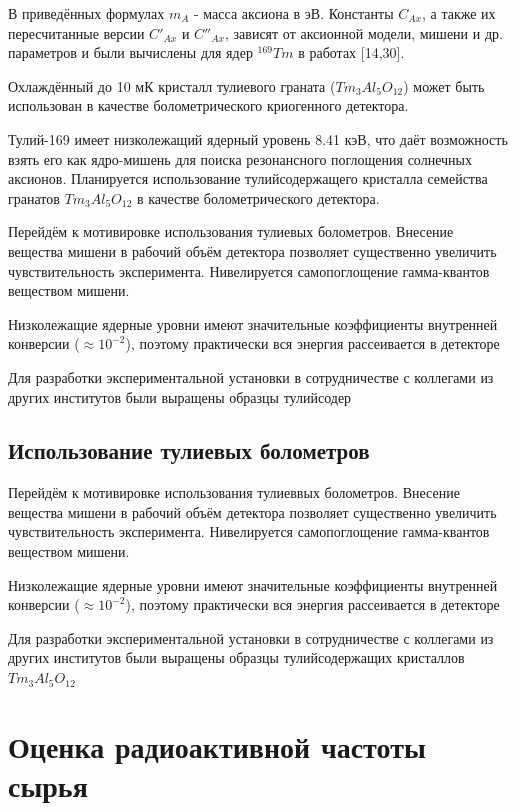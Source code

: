 \documentclass[a4paper,article,14pt]{extarticle}
\begin{document}
В приведённых формулах $m_A$ - масса аксиона в эВ. Константы $C_{Ax }$, а также их пересчитанные версии $C'_{Ax }$ и $C''_{Ax }$, зависят от аксионной модели, мишени и др. параметров и были вычислены для ядер $^{169}Tm$ в работах [14,30].

Охлаждённый до 10 мК кристалл тулиевого граната ($Tm_3Al_5O_{12}$) может быть использован в качестве болометрического криогенного детектора. 

Тулий-169 имеет низколежащий ядерный уровень 8.41 кэВ, что даёт возможность взять его как ядро-мишень для поиска резонансного поглощения солнечных аксионов. Планируется использование тулийсодержащего кристалла семейства гранатов $Tm_3Al_5O_{12}$ в качестве болометрического детектора.



Перейдём к мотивировке использования тулиевых болометров. Внесение вещества мишени в рабочий объём детектора позволяет существенно увеличить чувствительность эксперимента. Нивелируется самопоглощение гамма-квантов веществом мишени.

Низколежащие ядерные уровни имеют значительные коэффициенты внутренней конверсии  ($\approx 10^{-2}$), поэтому практически вся энергия рассеивается в детекторе

Для разработки экспериментальной установки в сотрудничестве с коллегами из других институтов были выращены образцы тулийсодер


\subsection{Использование тулиевых болометров}

Перейдём к мотивировке использования тулиеввых болометров. Внесение вещества мишени в рабочий объём детектора позволяет существенно увеличить чувствительность эксперимента. Нивелируется самопоглощение гамма-квантов веществом мишени.

Низколежащие ядерные уровни имеют значительные коэффициенты внутренней конверсии  ($\approx 10^{-2}$), поэтому практически вся энергия рассеивается в детекторе

Для разработки экспериментальной установки в сотрудничестве с коллегами из других институтов были выращены образцы тулийсодержащих кристаллов $Tm_3Al_5O_{12}$




\section{Оценка радиоактивной частоты сырья}
\end{document}

